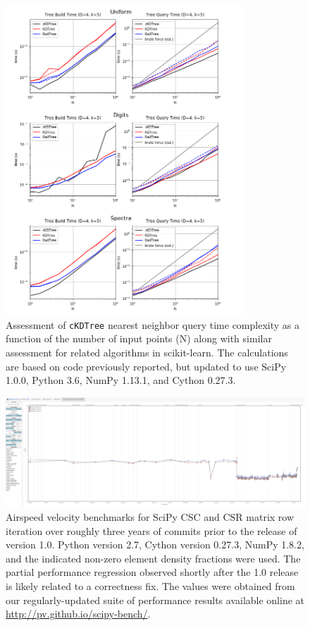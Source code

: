 \documentclass[fleqn,10pt]{wlscirep}
\begin{document}
\begin{figure}[H]
\centering
\includegraphics[width=0.8\textwidth]{supporting_info/knn_complexity_confirm}
\caption{Assessment of \texttt{cKDTree} nearest neighbor query time complexity as a function of the number of input points (N) along with similar assessment for related algorithms in scikit-learn. The calculations are based on code previously reported\cite{knn-jake}, but updated to use SciPy 1.0.0, Python 3.6, NumPy 1.13.1, and Cython 0.27.3.}
\label{fig:knn-complexity}
\end{figure}

\begin{figure}[H]
\centering
\includegraphics[width=\textwidth]{supporting_info/asv_bench/sparse/sparse_iteration_bench}
\caption{Airspeed velocity benchmarks for SciPy CSC and CSR matrix row iteration over roughly three years of commits prior to the release of version 1.0. Python version 2.7, Cython version 0.27.3, NumPy 1.8.2, and the indicated non-zero element density fractions were used. The partial performance regression observed shortly after the 1.0 release is likely related to a correctness fix\cite{sparse-regress}. The values were obtained from our regularly-updated suite of performance results available online at \url{http://pv.github.io/scipy-bench/}.}
\label{fig:sparse-iter}
\end{figure}
\end{document}
